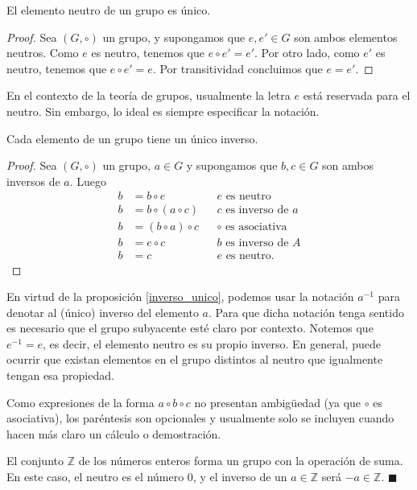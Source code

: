 \begin{proposition}
El elemento neutro de un grupo es único.
\end{proposition}

\begin{proof}
Sea $(G,\circ)$ un grupo, y supongamos que $e, e' \in G$ son ambos elementos neutros. Como $e$ es neutro, tenemos que $e \circ e' = e'$. Por otro lado, como $e'$ es neutro, tenemos que $e \circ e' = e$. Por transitividad concluimos que $e = e'$.
\end{proof}

En el contexto de la teoría de grupos, usualmente la letra $e$ está reservada para el neutro. Sin embargo, lo ideal es siempre especificar la notación. 

\begin{proposition} \label{inverso_unico}
	Cada elemento de un grupo tiene un único inverso.
	\end{proposition}
	
	\begin{proof}
	Sea $(G,\circ)$ un grupo, $a \in G$ y supongamos que $b, c \in G$ son ambos inversos de $a$. Luego
	\begin{align*}
	b &= b \circ e && e \text{ es neutro} \\
	b &= b \circ \left( a \circ c \right) && c \text{ es inverso de } a \\
	b &= \left( b \circ a \right) \circ c && \text{$\circ$} \text{ es asociativa} \\
	b &= e \circ c && b \text{ es inverso de } A \\
	b &= c && e \text{ es neutro}.
	\end{align*}
	\end{proof}

En virtud de la proposición \ref{inverso_unico}, podemos usar la notación $a^{-1}$ para denotar al (único) inverso del elemento $a$. Para que dicha notación tenga sentido es necesario que el grupo subyacente esté claro por contexto. 
Notemos que $e^{-1} = e$, es decir, el elemento neutro es su propio inverso. En general, puede ocurrir que existan elementos en el grupo distintos al neutro que igualmente tengan esa propiedad.

Como expresiones de la forma $a \circ b \circ c$ no presentan ambigüedad (ya que $\circ$ es asociativa), los paréntesis son opcionales y usualmente solo se incluyen cuando hacen más claro un cálculo o demostración.

\begin{example} \label{ejemplo_Z}
El conjunto $\mathbb{Z}$ de los números enteros forma un grupo con la operación de suma. En este caso, el neutro es el número $0$, y el inverso de un $a \in \mathbb{Z}$ será $-a \in \mathbb{Z}$. \hfill$\blacksquare$
\end{example}

